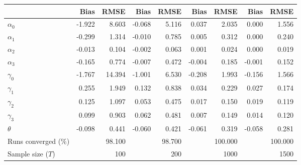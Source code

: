 
\begin{tabular}[t]{lrrrrrrrr}
\toprule
  & Bias & RMSE & Bias & RMSE & Bias & RMSE & Bias & RMSE\\
\midrule
$\alpha_{0}$ & -1.922 & 8.603 & -0.068 & 5.116 & 0.037 & 2.035 & 0.000 & 1.556\\
$\alpha_{1}$ & -0.299 & 1.314 & -0.010 & 0.785 & 0.005 & 0.312 & 0.000 & 0.240\\
$\alpha_{2}$ & -0.013 & 0.104 & -0.002 & 0.063 & 0.001 & 0.024 & 0.000 & 0.019\\
$\alpha_{3}$ & -0.165 & 0.774 & -0.007 & 0.472 & -0.004 & 0.185 & -0.001 & 0.152\\
$\gamma_{0}$ & -1.767 & 14.394 & -1.001 & 6.530 & -0.208 & 1.993 & -0.156 & 1.566\\
$\gamma_{1}$ & 0.255 & 1.949 & 0.132 & 0.838 & 0.034 & 0.229 & 0.027 & 0.174\\
$\gamma_{2}$ & 0.125 & 1.097 & 0.053 & 0.475 & 0.017 & 0.150 & 0.019 & 0.119\\
$\gamma_{3}$ & 0.099 & 0.903 & 0.062 & 0.481 & 0.007 & 0.149 & 0.014 & 0.120\\
$\theta$ & -0.098 & 0.441 & -0.060 & 0.421 & -0.061 & 0.319 & -0.058 & 0.281\\
Runs converged (\%) &  & 98.100 &  & 98.700 &  & 100.000 &  & 100.000\\
Sample size ($T$) &  & 100 &  & 200 &  & 1000 &  & 1500\\
\bottomrule
\end{tabular}
